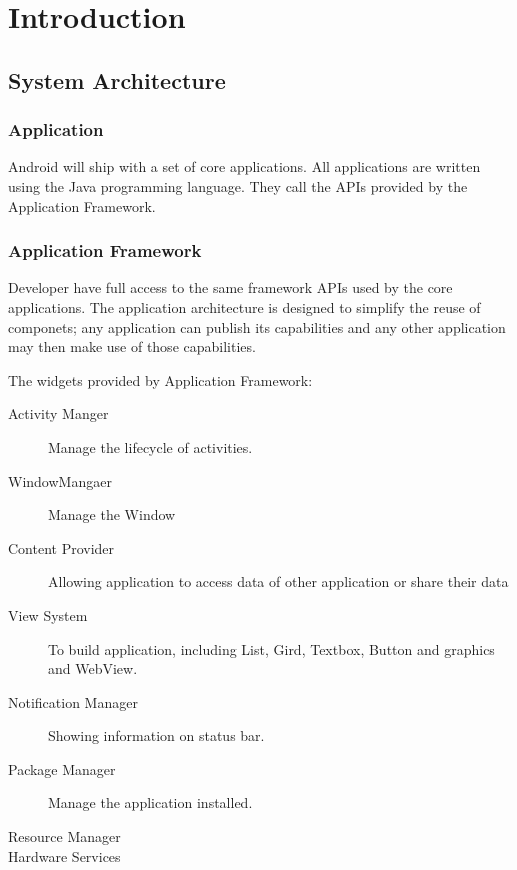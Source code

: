 \documentclass[a4paper,11pt]{book}
\begin{document}
\chapter{Introduction}
\section{System Architecture}
\subsection{Application}
Android will ship with a set of core applications. All applications are written
using the Java programming language. They call the APIs provided by the Application Framework.
\subsection{Application Framework}
Developer have full access to the same framework APIs used by the core
applications. The application architecture is designed to simplify the reuse of
componets; any application can publish its capabilities and any other
application may then make use of those capabilities.

The widgets provided by Application Framework:
\begin{description}
\item[Activity Manger]Manage the lifecycle of activities.
\item[WindowMangaer] Manage the Window
\item[Content Provider] Allowing application to access data of other application
or share their data
\item[View System] To build application, including List, Gird, Textbox, Button
and graphics and WebView.
\item[Notification Manager] Showing information on status bar.
\item[Package Manager] Manage the application installed.
\item[Resource Manager]
\item[Hardware Services]
\end{description}
\end{document}
